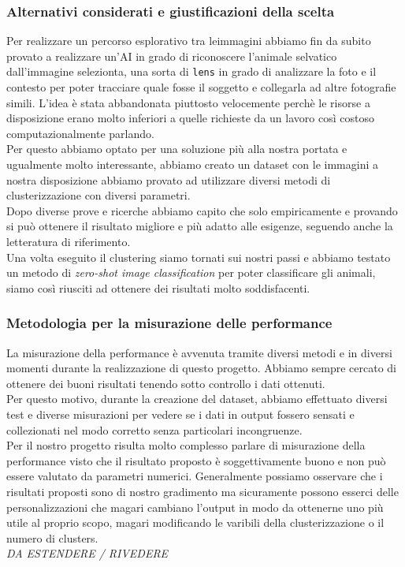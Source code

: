 \documentclass[12pt,a4paper,twoside]{article}
\begin{document}
\subsubsection{Alternativi considerati e giustificazioni della scelta}
Per realizzare un percorso esplorativo tra leimmagini abbiamo fin da subito provato a realizzare 
un'AI in grado di riconoscere l'animale selvatico dall'immagine selezionta, una sorta di 
\texttt{lens} in grado di analizzare la foto e il contesto per poter tracciare quale fosse il 
soggetto e collegarla ad altre fotografie simili. L'idea è stata abbandonata piuttosto 
velocemente perchè le risorse a disposizione erano molto inferiori a quelle richieste da un 
lavoro così costoso computazionalmente parlando.\\
Per questo abbiamo optato per una soluzione più alla nostra portata e ugualmente molto 
interessante, abbiamo creato un dataset con le immagini a nostra disposizione abbiamo provato 
ad utilizzare diversi metodi di clusterizzazione con diversi parametri.\\
Dopo diverse prove e ricerche abbiamo capito che solo empiricamente e provando si può ottenere 
il risultato migliore e più adatto alle esigenze, seguendo anche la letteratura di riferimento.\\
Una volta eseguito il clustering siamo tornati sui nostri passi e abbiamo testato un metodo di 
\textit{zero-shot image classification} per poter classificare gli animali, siamo così riusciti 
ad ottenere dei risultati molto soddisfacenti.

\subsubsection{Metodologia per la misurazione delle performance}
La misurazione della performance è avvenuta tramite diversi metodi e in diversi momenti durante la 
realizzazione di questo progetto. Abbiamo sempre cercato di ottenere dei buoni risultati tenendo 
sotto controllo i dati ottenuti.\\
Per questo motivo, durante la creazione del dataset, abbiamo effettuato diversi test e diverse 
misurazioni per vedere se i dati in output fossero sensati e collezionati nel modo corretto senza 
particolari incongruenze.\\
Per il nostro progetto risulta molto complesso parlare di misurazione della performance visto che 
il risultato proposto è soggettivamente buono e non può essere valutato da parametri numerici. 
Generalmente possiamo osservare che i risultati proposti sono di nostro gradimento ma sicuramente 
possono esserci delle personalizzazioni che magari cambiano l'output in modo da ottenerne uno più 
utile al proprio scopo, magari modificando le varibili della clusterizzazione o il numero di 
clusters.\\
\textit{DA ESTENDERE / RIVEDERE}
\end{document}

